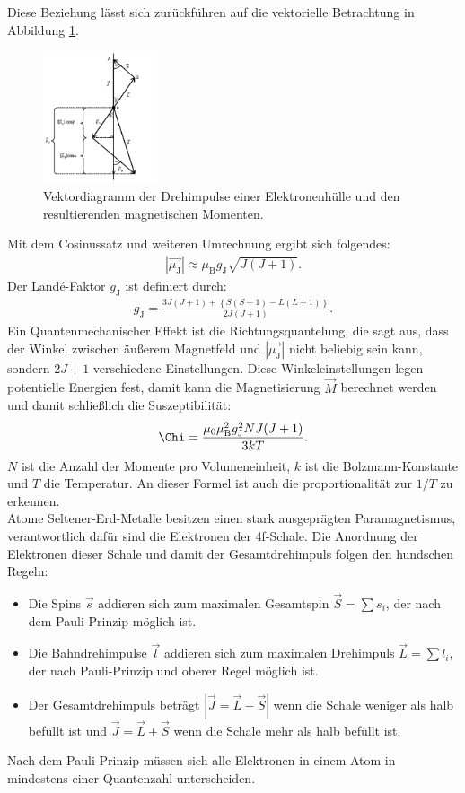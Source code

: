 Diese Beziehung lässt sich zurückführen auf die vektorielle Betrachtung
in Abbildung \ref{fig:winkel}.
\begin{figure}
 \centering
 \includegraphics[width=0.3\textwidth]{winkel.png}
 \caption{Vektordiagramm der Drehimpulse einer Elektronenhülle und den resultierenden magnetischen Momenten.\cite{sample} }
 \label{fig:winkel}
 \end{figure}
Mit dem Cosinussatz und weiteren Umrechnung ergibt sich folgendes:
\begin{align}
 |\vec{\mu_\mathrm{J}}| \approx \mu_\mathrm{B} g_\mathrm{J} \sqrt{J(J+1)}.
\end{align}
Der Landé-Faktor $g_\mathrm{J}$ ist definiert durch:
\begin{align}
  g_\mathrm{J}=\frac{3J(J+1)+\left\{S(S+1)-L(L+1)\right\}}{2J(J+1)}.\label{eqn:lande}
\end{align}
Ein Quantenmechanischer Effekt ist die Richtungsquantelung,
die sagt aus, dass der Winkel zwischen äußerem Magnetfeld und
$|\vec{\mu_\mathrm{J}}|$  nicht beliebig sein kann, sondern $2J+1$
verschiedene Einstellungen. Diese Winkeleinstellungen legen potentielle Energien fest,
damit kann die Magnetisierung $\vec{M}$ berechnet werden und damit schließlich
die Suszeptibilität:
\begin{align}
  \Chi=\frac{\mu_0\mu_\mathrm{B}^2g_\mathrm{J}^2NJ(J+1)}{3kT}.\label{eqn:XT}
\end{align}
$N$ ist die Anzahl der Momente pro Volumeneinheit, $k$ ist die Bolzmann-Konstante und
$T$ die Temperatur. An dieser Formel ist auch die proportionalität zur $1/T$ zu erkennen.\\
Atome Seltener-Erd-Metalle besitzen einen stark ausgeprägten Paramagnetismus,
verantwortlich dafür sind die Elektronen der 4f-Schale. Die Anordnung der Elektronen dieser
Schale und damit der Gesamtdrehimpuls folgen den hundschen Regeln:
\begin{itemize}
  \item Die Spins $\vec{s}$ addieren sich zum maximalen Gesamtspin
   $\vec{S}=\sum s_i$, der nach dem Pauli-Prinzip möglich ist.
   \item Die Bahndrehimpulse $\vec{l}$ addieren sich zum maximalen Drehimpuls
   $\vec{L}=\sum l_i$, der nach Pauli-Prinzip und oberer Regel möglich ist.
   \item Der Gesamtdrehimpuls beträgt $|\vec{J}=\vec{L}-\vec{S}|$ wenn die
   Schale weniger als halb befüllt ist und $\vec{J}=\vec{L}+\vec{S}$ wenn die
   Schale mehr als halb befüllt ist.
\end{itemize}
Nach dem Pauli-Prinzip müssen sich alle Elektronen in einem Atom in mindestens
einer Quantenzahl unterscheiden.
